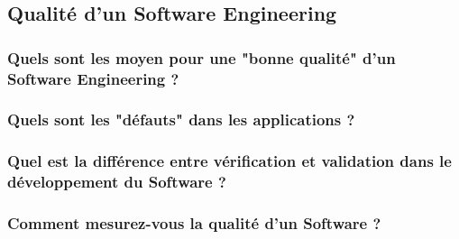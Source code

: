 \subsection{Qualité d'un Software Engineering}



\subsubsection{Quels sont les moyen pour une "bonne qualité" d'un Software Engineering ?}



\subsubsection{Quels sont les "défauts" dans les applications ?}



\subsubsection{Quel est la différence entre vérification et validation dans le développement du Software ?}



\subsubsection{Comment mesurez-vous la qualité d'un Software ?}